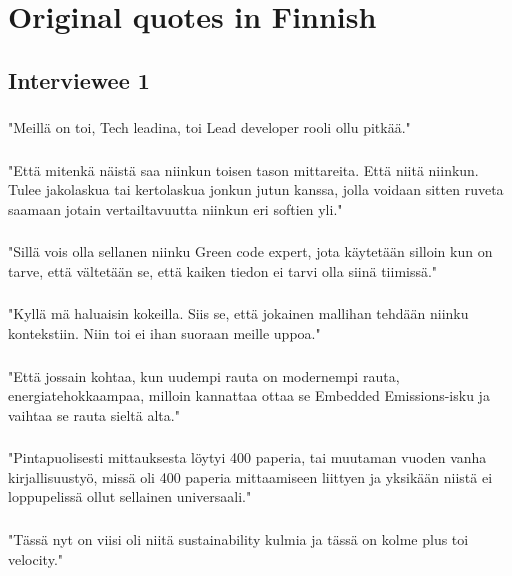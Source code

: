 \appendix

\chapter{Original quotes in Finnish}\label{appendixa}

\section{Interviewee 1}
\subsection{}\label{i11}
"Meillä on toi, Tech leadina, toi Lead developer rooli ollu pitkää."
\subsection{}\label{i12}
"Että mitenkä näistä saa niinkun toisen tason mittareita. Että niitä niinkun. Tulee jakolaskua tai kertolaskua jonkun jutun kanssa, jolla voidaan sitten ruveta saamaan jotain vertailtavuutta niinkun eri softien yli."
\subsection{}\label{i13}
"Sillä vois olla sellanen niinku Green code expert, jota käytetään silloin kun on tarve, että vältetään se, että kaiken tiedon ei tarvi olla siinä tiimissä."
\subsection{}\label{i14}
"Kyllä mä haluaisin kokeilla. Siis se, että jokainen mallihan tehdään niinku kontekstiin. Niin toi ei ihan suoraan meille uppoa."
\subsection{}\label{i15}
"Että jossain kohtaa, kun uudempi rauta on modernempi rauta, energiatehokkaampaa,
milloin kannattaa ottaa se Embedded Emissions-isku ja vaihtaa se rauta sieltä alta."
\subsection{}\label{i16}
"Pintapuolisesti mittauksesta löytyi 400 paperia, tai muutaman vuoden vanha kirjallisuustyö, missä oli 400 paperia mittaamiseen liittyen ja yksikään niistä ei loppupelissä ollut sellainen universaali."
\subsection{}\label{i17}
"Tässä nyt on viisi oli niitä sustainability kulmia ja tässä on kolme plus toi velocity."

